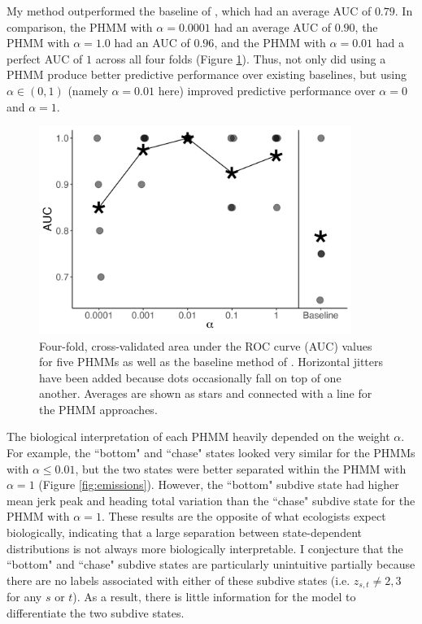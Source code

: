 My method outperformed the baseline of \cite{Tennessen:2019a}, which had an average AUC of $0.79$. In comparison, the PHMM with $\alpha = 0.0001$ had an average AUC of $0.90$, the PHMM with $\alpha = 1.0$ had an AUC of $0.96$, and the PHMM with $\alpha = 0.01$ had a perfect AUC of $1$ across all four folds (Figure \ref{fig:AUCs_cs2}). Thus, not only did using a PHMM produce better predictive performance over existing baselines, but using $\alpha \in (0,1)$ (namely $\alpha = 0.01$ here) improved predictive performance over $\alpha = 0$ and $\alpha = 1$.

\begin{figure}
    \centering
    \includegraphics[width = 4in]{plt/AUCs_delt_d_htv_jp_normed_4.png}
    \caption{Four-fold, cross-validated area under the ROC curve (AUC) values for five PHMMs as well as the baseline method of \citet{Tennessen:2019a}. Horizontal jitters have been added because dots occasionally fall on top of one another. Averages are shown as stars and connected with a line for the PHMM approaches.}
    \label{fig:AUCs_cs2}
\end{figure}

The biological interpretation of each PHMM heavily depended on the weight $\alpha$. For example, the ``bottom" and ``chase" states looked very similar for the PHMMs with $\alpha \leq 0.01$, but the two states were better separated within the PHMM with $\alpha = 1$ (Figure \ref{fig:emissions}). %
However, the ``bottom" subdive state had higher mean jerk peak and heading total variation than the ``chase" subdive state for the PHMM with $\alpha = 1$. These results are the opposite of what ecologists expect biologically, indicating that a large separation between state-dependent distributions is not always more biologically interpretable. I conjecture that the ``bottom" and ``chase" subdive states are particularly unintuitive partially because there are no labels associated with either of these subdive states (i.e. $z_{s,t} \neq 2,3$ for any $s$ or $t$). As a result, there is little information for the model to differentiate the two subdive states. 

